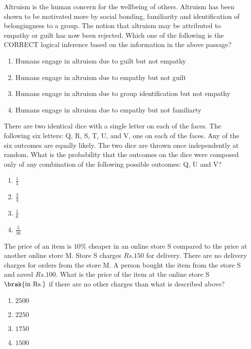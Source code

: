 \item{
Altruism is the human concern for the wellbeing of others. Altruism has been shown to be motivated more by social bonding, familiarity and identification of belongingness to a group. The notion that altruism may be attributed to empathy or guilt has now been rejected.
Which one of the following is the CORRECT logical inference based on the information in the above passage?
\begin{enumerate}
\item Humans engage in altruism due to guilt but not empathy
\item Humans engage in altruism due to empathy but not guilt
\item Humans engage in altruism due to group identification but not empathy
\item Humans engage in altruism due to empathy but not familiarty
\end{enumerate}
}
\item{
There are two identical dice with a single letter on each of the faces. The following six letters: Q, R, S, T, U, and V, one on each of the faces. Any of the six outcomes are equally likely.
The two dice are thrown once independently at random.
What is the probability that the outcomes on the dice were composed only of any combination of the following possible outcomes: Q, U and V?
\begin{multicols}{4}
\begin{enumerate}
\item $\frac{1}{4}$
\item $\frac{3}{4}$
\item $\frac{1}{6}$
\item $\frac{5}{36}$
\end{enumerate}
\end{multicols}
}
\item{
The price of an item is $10\%$ cheaper in an online store S compared to the price
at another online store M. Store S charges $Rs.150$ for delivery. There are no
delivery charges for orders from the store M. A person bought the item from the store S and saved $Rs.100$.
What is the price of the item at the online store S $\brak{\text{in Rs.}}$ if there are no other charges than what is described above?
\begin{multicols}{4}
\begin{enumerate}
\item $2500$
\item $2250$
\item $1750$
\item $1500$
\end{enumerate}
\end{multicols}
}
